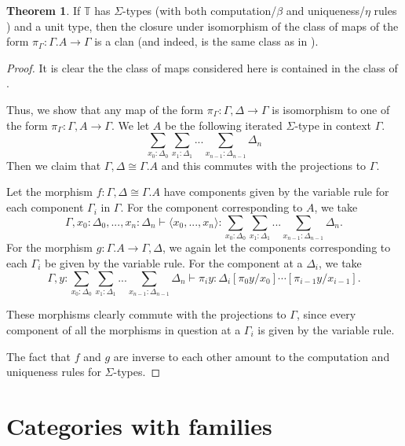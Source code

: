 \documentclass{article}
\theoremstyle{definition}
\newtheorem{theorem}[definition]{Theorem}
\newcommand{\T}{\mathbb T}
\begin{document}
\begin{theorem}
    If $\T$ has $\Sigma$-types (with both computation/$\beta$ and uniqueness/$\eta$ rules \cite{nlab-sums}) and a unit type, then the closure under isomorphism of the class of maps of the form $\pi_\Gamma : \Gamma. A \to \Gamma$ is a clan (and indeed, is the same class as in ).
\end{theorem}
\begin{proof}
    It is clear the the class of maps considered here is contained in the class of .
    
    Thus, we show that any map of the form $\pi_\Gamma : \Gamma, \Delta \to \Gamma$ is isomorphism to one of the form $\pi_\Gamma : \Gamma, A \to \Gamma$. We let $A$ be the following iterated $\Sigma$-type in context $\Gamma$.
    \[\sum_{x_0 : \Delta_0} \sum_{x_1: \Delta_1} ... \sum_{x_{n-1}: \Delta_{n-1}} \Delta_n \]
    Then we claim that $\Gamma, \Delta \cong \Gamma.A$ and this commutes with the projections to $\Gamma$.

    Let the morphism $f: \Gamma, \Delta \cong \Gamma.A$ have components given by the variable rule for each component $\Gamma_i$ in $\Gamma$. For the component corresponding to $A$, we take 
    \[ \Gamma, x_0 : \Delta_0, ..., x_n : \Delta_n \vdash \langle x_0, ..., x_n \rangle : \sum_{x_0 : \Delta_0} \sum_{x_1: \Delta_1} ... \sum_{x_{n-1}: \Delta_{n-1}} \Delta_n. \]
    For the morphism $g: \Gamma.A \to \Gamma, \Delta$, we again let the components corresponding to each $\Gamma_i$ be given by the variable rule. For the component at a $\Delta_i$, we take 
    \[ \Gamma, y : \sum_{x_0 : \Delta_0} \sum_{x_1: \Delta_1} ... \sum_{x_{n-1}: \Delta_{n-1}} \Delta_n \vdash 
    \pi_i y : \Delta_i[\pi_0 y / x_0]\cdots[\pi_{i-1} y / x_{i-1}]. \]

    These morphisms clearly commute with the projections to $\Gamma$, since every component of all the morphisms in question at a $\Gamma_i$ is given by the variable rule.

    The fact that $f$ and $g$ are inverse to each other amount to the computation and uniqueness rules for $\Sigma$-types.
\end{proof}

\section{Categories with families}
\end{document}
